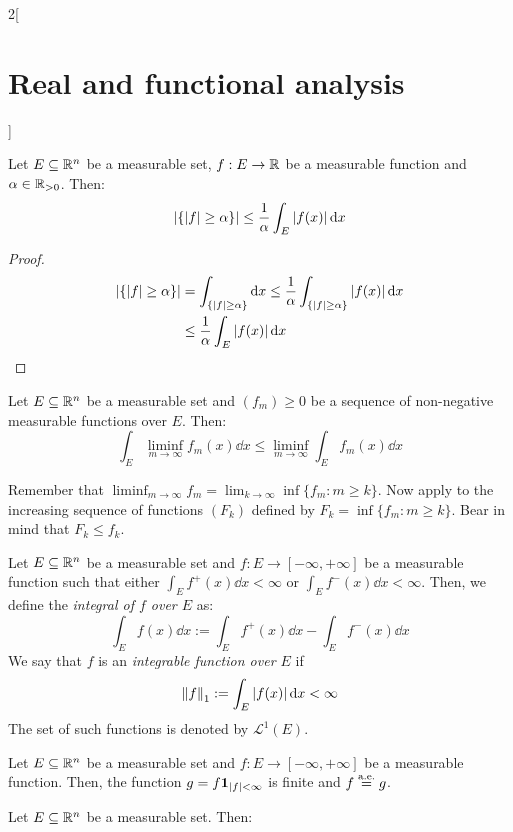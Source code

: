 \documentclass[../../../main_math.tex]{subfiles}
\begin{document}
\begin{multicols}{2}[\section{Real and functional analysis}]
\begin{sproof}
  \end{sproof}
  \begin{theorem}
    Let $E\subseteq\mathbb{R}^n$ be a measurable set, $f:E\rightarrow\mathbb{R}$ be a measurable function and $\alpha\in\mathbb{R}_{>0}$. Then: $$\m{\{\abs{f}\geq\alpha\}}\leq\frac{1}{\alpha}\int_E \abs{f(x)}\dd{x}$$
  \end{theorem}
  \begin{proof}
    \begin{align*}
      \m{\{\abs{f}\geq\alpha\}} & =\int_{\{\abs{f}\geq\alpha\}}\dd{x}\leq\frac{1}{\alpha}\int_{\{\abs{f}\geq\alpha\}} \abs{f(x)}\dd{x} \\
                                & \leq\frac{1}{\alpha}\int_E \abs{f(x)}\dd{x}
    \end{align*}
  \end{proof}
  \begin{lemma}\label{RFA:fatou}
    Let $E\subseteq\mathbb{R}^n$ be a measurable set and $(f_m)\geq 0$ be a sequence of non-negative measurable functions over $E$. Then: $$\int_E\liminf_{m\to\infty}f_m(x)\dd{x}\leq \liminf_{m\to\infty}\int_Ef_m(x)\dd{x}$$
  \end{lemma}
  \begin{sproof}
    Remember that $\displaystyle\liminf_{m\to\infty} f_m=\lim_{k\to\infty}\inf\{f_m:m\geq k\}$. Now apply  to the increasing sequence of functions $(F_k)$ defined by $F_k=\inf\{f_m:m\geq k\}$. Bear in mind that $F_k\leq f_k$.
  \end{sproof}
  \begin{definition}
    Let $E\subseteq\mathbb{R}^n$ be a measurable set and $f:E\rightarrow[-\infty,+\infty]$ be a measurable function such that either $\int_Ef^+(x)\dd{x}<\infty$ or $\int_Ef^-(x)\dd{x}<\infty$. Then, we define the \emph{integral of $f$ over $E$} as: $$\int_Ef(x)\dd{x}:=\int_Ef^+(x)\dd{x}-\int_Ef^-(x)\dd{x}$$
    We say that $f$ is an \emph{integrable function over $E$} if $${\left\|f\right\|}_1:=\int_E\abs{f(x)}\dd{x}<\infty$$ The set of such functions is denoted by $ \mathcal{L}^1(E)$.
  \end{definition}
  \begin{proposition}
    Let $E\subseteq\mathbb{R}^n$ be a measurable set and $f:E\rightarrow[-\infty,+\infty]$ be a measurable function. Then, the function $g=f\boldsymbol{\mathrm{1}}_{\abs{f}<\infty}$ is finite and $f\overset{\text{a.e.}}{=}g$.
  \end{proposition}
  \begin{proposition}
    Let $E\subseteq\mathbb{R}^n$ be a measurable set. Then:

\end{proposition}
\end{multicols}
\end{document}
